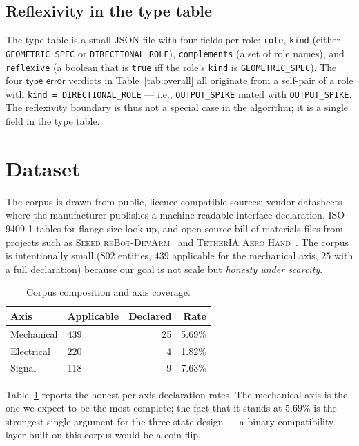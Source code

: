 \subsection{Reflexivity in the type table}

The type table is a small JSON file with four fields per role:
\texttt{role}, \texttt{kind} (either \texttt{GEOMETRIC\_SPEC} or
\texttt{DIRECTIONAL\_ROLE}), \texttt{complements} (a set of role names),
and \texttt{reflexive} (a boolean that is \texttt{true} iff the
role's \texttt{kind} is \texttt{GEOMETRIC\_SPEC}). The four $\mathsf{type\_error}$
verdicts in Table~\ref{tab:overall} all originate from a
self-pair of a role with \texttt{kind = DIRECTIONAL\_ROLE} — i.e.,
\texttt{OUTPUT\_SPIKE} mated with \texttt{OUTPUT\_SPIKE}. The
reflexivity boundary is thus not a special case in the algorithm;
it is a single field in the type table.

\section{Dataset}

The corpus is drawn from public, licence-compatible sources: vendor
datasheets where the manufacturer publishes a machine-readable
interface declaration, ISO 9409-1 tables for flange size look-up,
and open-source bill-of-materials files from projects such as
\textsc{Seeed reBot-DevArm}~\cite{R14} and \textsc{TetherIA Aero
Hand}~\cite{R15}. The corpus is intentionally small
($802$ entities, $439$ applicable for the mechanical axis,
$25$ with a full declaration) because our goal is not scale but
\emph{honesty under scarcity}.

\begin{table}[ht]
\centering
\caption{Corpus composition and axis coverage.}
\label{tab:corpus}
\begin{tabular}{@{}llrr@{}}
\toprule
Axis       & Applicable & Declared & Rate \\
\midrule
Mechanical & 439        & 25       & 5.69\% \\
Electrical & 220        & 4        & 1.82\% \\
Signal     & 118        & 9        & 7.63\% \\
\bottomrule
\end{tabular}
\end{table}

Table~\ref{tab:corpus} reports the honest per-axis declaration rates.
The mechanical axis is the one we expect to be the most complete; the
fact that it stands at $5.69\%$ is the strongest single argument for
the three-state design — a binary compatibility layer built on this
corpus would be a coin flip.


